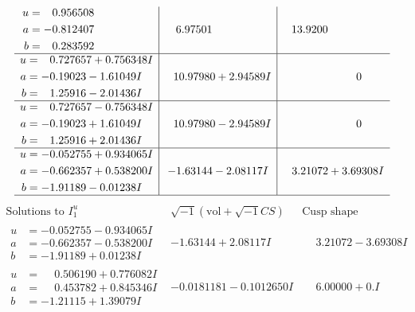 \documentclass[1p]{elsarticle_modified}
\theoremstyle{definition}
\newcommand{\I}{\sqrt{-1}}
\begin{document}
$$\begin{array}{c|c|c}
\begin{aligned}
u &= \phantom{-}0.956508\phantom{ +0.000000I} \\
a &= -0.812407\phantom{ +0.000000I} \\
b &= \phantom{-}0.283592\phantom{ +0.000000I}\end{aligned}
 & \phantom{-}6.97501\phantom{ +0.000000I} & \phantom{-}13.9200\phantom{ +0.000000I} \\ \hline\begin{aligned}
u &= \phantom{-}0.727657 + 0.756348 I \\
a &= -0.19023 - 1.61049 I \\
b &= \phantom{-}1.25916 - 2.01436 I\end{aligned}
 & \phantom{-}10.97980 + 2.94589 I & \phantom{-0.000000 } 0 \\ \hline\begin{aligned}
u &= \phantom{-}0.727657 - 0.756348 I \\
a &= -0.19023 + 1.61049 I \\
b &= \phantom{-}1.25916 + 2.01436 I\end{aligned}
 & \phantom{-}10.97980 - 2.94589 I & \phantom{-0.000000 } 0 \\ \hline\begin{aligned}
u &= -0.052755 + 0.934065 I \\
a &= -0.662357 + 0.538200 I \\
b &= -1.91189 - 0.01238 I\end{aligned}
 & -1.63144 - 2.08117 I & \phantom{-}3.21072 + 3.69308 I\\
 \hline 
 \end{array}$$\newpage$$\begin{array}{c|c|c}  
\text{Solutions to }I^u_{1}& \I (\text{vol} + \sqrt{-1}CS) & \text{Cusp shape}\\
 \hline 
\begin{aligned}
u &= -0.052755 - 0.934065 I \\
a &= -0.662357 - 0.538200 I \\
b &= -1.91189 + 0.01238 I\end{aligned}
 & -1.63144 + 2.08117 I & \phantom{-}3.21072 - 3.69308 I \\ \hline\begin{aligned}
u &= \phantom{-}0.506190 + 0.776082 I \\
a &= \phantom{-}0.453782 + 0.845346 I \\
b &= -1.21115 + 1.39079 I\end{aligned}
 & -0.0181181 - 0.1012650 I & \phantom{-}6.00000 + 0. I\phantom{ +0.000000I} \\ \hline\begin{aligned}

\end{aligned}
\end{array}$$
\end{document}
